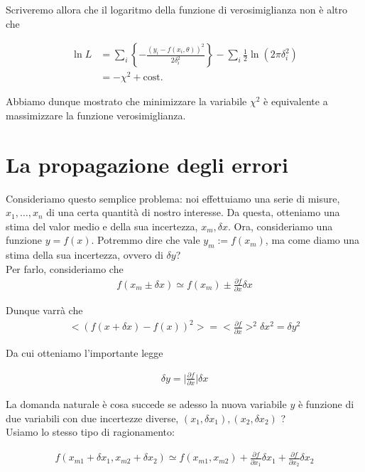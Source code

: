 \documentclass{report}
\begin{document}
Scriveremo allora che il logaritmo della funzione di verosimiglianza non è altro che 

\begin{align}
    \ln L &= \sum_i \left\{-\frac{(y_i - f(x_i, \theta))^2}{2\delta_i^2}\right\} -\sum_i\frac{1}{2}\ln(2\pi \delta_i^2) \\
    &= -\chi^2 + \text{cost.}
\end{align}

Abbiamo dunque mostrato che minimizzare la variabile \(\chi^2\) è equivalente a massimizzare la funzione verosimiglianza. 


\section{La propagazione degli errori}

Consideriamo questo semplice problema: noi effettuiamo una serie di misure, \(x_1, \ldots, x_n\) di una certa quantità di nostro interesse. Da questa, otteniamo una stima del valor medio e della sua incertezza, \(x_m, \delta x\). Ora, consideriamo una funzione \(y = f(x)\). Potremmo dire che vale \(y_m := f(x_m)\), ma come diamo una stima della sua incertezza, ovvero di \(\delta y\)? \\

Per farlo, consideriamo che 
\begin{align}
    f (x_m \pm \delta x) \simeq f(x_m) \pm \frac{\partial f}{\partial x}\delta x
\end{align}

Dunque varrà che 
\begin{align}
    <(f(x+\delta x) - f(x))^2 > = <\frac{\partial f}{\partial x}>^2 \delta x^2 = \delta y^2
\end{align}

Da cui otteniamo l'importante legge 

\begin{align}
    \delta y = \biggr|\frac{\partial f}{\partial x}\biggr|\delta x
\end{align}

La domanda naturale è cosa succede se adesso la nuova variabile \(y\) è funzione di due variabili con due incertezze diverse, \((x_1, \delta x_1), (x_2, \delta x_2)\) ? \\

Usiamo lo stesso tipo di ragionamento: 

\begin{align}
    f(x_{m1}+\delta x_1, x_{m2} + \delta x_2) \simeq f(x_{m1}, x_{m2}) + \frac{\partial f}{\partial x_1}\delta x_1 + \frac{\partial f}{\partial x_2}\delta x_2
\end{align}
\end{document}
